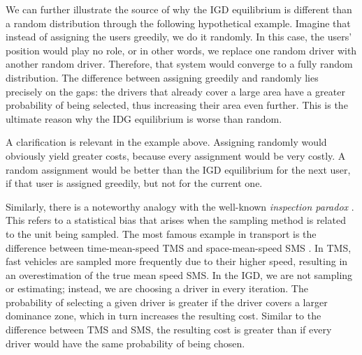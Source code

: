 \documentclass[12pt,english]{article}
\begin{document}
{We can further illustrate the source of why the IGD equilibrium is different than a random distribution through the following hypothetical example. Imagine that instead of assigning the users greedily, we do it randomly. In this case, the users' position would play no role, or in other words, we replace one random driver with another random driver. Therefore, that system would converge to a fully random distribution. The difference between assigning greedily and randomly lies precisely on the gaps: the drivers that already cover a large area have a greater probability of being selected, thus increasing their area even further. This is the ultimate reason why the IDG equilibrium is worse than random. 

A clarification is relevant in the example above. Assigning randomly would obviously yield greater costs, because every assignment would be very costly. A random assignment would be better than the IGD equilibrium for the next user, if that user is assigned greedily, but not for the current one.

Similarly, there is a noteworthy analogy with the well-known \textit{inspection paradox} \citep{stein1985sampling}.  This refers to a statistical bias that arises when the sampling method is related to the unit being sampled. The most famous example in transport is the difference between time-mean-speed TMS and space-mean-speed SMS \citep{knoop2009empirical}. In TMS, fast vehicles are sampled more frequently due to their higher speed, resulting in an overestimation of the true mean speed SMS. In the IGD, we are not sampling or estimating; instead, we are choosing a driver in every iteration. The probability of selecting a given driver is greater if the driver covers a larger dominance zone, which in turn increases the resulting cost. Similar to the difference between TMS and SMS, the resulting cost is greater than if every driver would have the same probability of being chosen.

}
\end{document}
